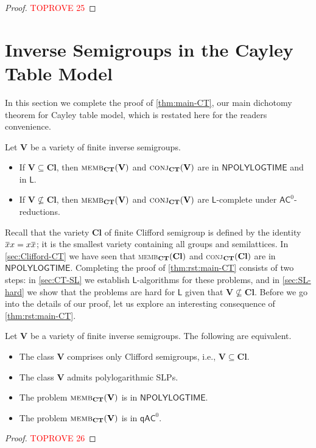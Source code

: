 \documentclass[anonymous,letter,UKenglish,cleveref,autoref,thm-restate]{lipics-v2021}
\newcommand{\sse}{\subseteq}
\newcommand{\NPOLYLOGTIME}{\ensuremath{\mathsf{NPOLYLOGTIME}}\xspace}
\newcommand{\ACz}{\ensuremath{\mathsf{AC}^0}\xspace}
\newcommand{\qACz}{\ensuremath{\mathsf{qAC}^0}\xspace}
\newcommand{\LOGSPACE}{\ensuremath{\mathsf{L}}\xspace}
\newcommand{\vV}{\ensuremath{\mathbf{V}}}
\newcommand{\vCl}{\ensuremath{\mathbf{Cl}}}
\newcommand\nindent{.5pt}
\newcommand\noverline[1]{\kern\nindent\overline{\kern-\nindent#1\kern-\nindent}\kern\nindent}
\newcommand{\ov}[1]{\noverline{#1}}
\theoremstyle{plain}
\theoremstyle{plain}
\newcommand{\dMemb}[2][]{\textup{\textsc{memb${}_{\mathbf{#1}}\expandafter\ifx\expandafter\relax\detokenize{#2}\relax\else(#2)\fi$}}}
\newcommand{\dConj}[2][]{\textup{\textsc{conj${}_{\mathbf{#1}}\expandafter\ifx\expandafter\relax\detokenize{#2}\relax\else(#2)\fi$}}}
\begin{document}
\begin{proof}\textcolor{red}{TOPROVE 25}\end{proof}



\section{Inverse Semigroups in the Cayley Table Model}\label{sec:SL-Cayley}



In this section we complete the proof of \cref{thm:main-CT}, our main dichotomy theorem for Cayley table model, which is restated here for the readers convenience.


\begin{theorem}\label{thm:rst:main-CT}
	Let $\vV$ be a variety of finite inverse semigroups. 
	\begin{itemize}
		\item If $\vV \sse \vCl$, then $\dMemb[CT]{\vV}$ and $\dConj[CT]{\vV}$ are in \NPOLYLOGTIME and in \LOGSPACE.
		\item If $\vV \not\sse \vCl$, then $\dMemb[CT]{\vV}$ and $\dConj[CT]{\vV}$ are \LOGSPACE-complete under \ACz-reductions.
	\end{itemize}
\end{theorem}

Recall that the variety $\vCl$ of finite Clifford semigroup is defined by the identity $\ov x x = x \ov x$; it is the smallest variety containing all groups and semilattices. 
In \cref{sec:Clifford-CT} we have seen that \dMemb[CT]{\vCl} and \dConj[CT]{\vCl} are in \NPOLYLOGTIME.
Completing the proof of \cref{thm:rst:main-CT} consists of two steps: in \cref{sec:CT-SL} we establish \LOGSPACE-algorithms for these problems, and in \cref{sec:SL-hard} we show that the problems are hard for \LOGSPACE given that $\vV \not\sse \vCl$.
Before we go into the details of our proof, let us explore an interesting consequence of \cref{thm:rst:main-CT}.

\begin{corollary}\label{cor:short-SLP-char}
  Let $\vV$ be a variety of finite inverse semigroups.
  The following are equivalent.
  \begin{itemize}
    \item The class $\vV$ comprises only Clifford semigroups, i.e., $\vV \sse \vCl$.
    \item The class $\vV$ admits polylogarithmic SLPs.
    \item The problem $\dMemb[CT]{\vV}$ is in \NPOLYLOGTIME.
    \item The problem $\dMemb[CT]{\vV}$ is in \qACz.
  \end{itemize}
\end{corollary}
\begin{proof}\textcolor{red}{TOPROVE 26}\end{proof}
\end{document}
